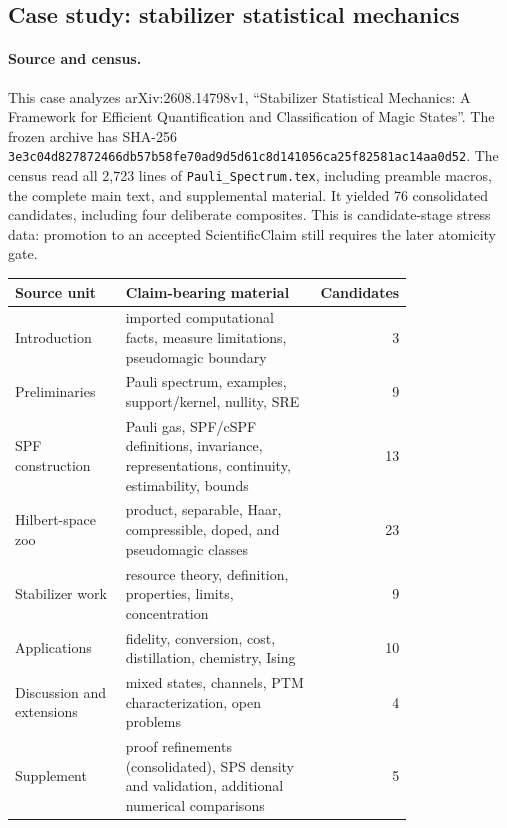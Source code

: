 \subsection{Case study: stabilizer statistical mechanics}\label{case:2608-14798}

\paragraph{Source and census.}
This case analyzes arXiv:2608.14798v1, ``Stabilizer Statistical Mechanics: A Framework for Efficient Quantification and Classification of Magic States''. The frozen archive has SHA-256 \texttt{3e3c04d827872466db57b58fe70ad9d5d61c8d141056ca25f82581ac14aa0d52}. The census read all 2,723 lines of \texttt{Pauli\_Spectrum.tex}, including preamble macros, the complete main text, and supplemental material. It yielded 76 consolidated candidates, including four deliberate composites. This is candidate-stage stress data: promotion to an accepted ScientificClaim still requires the later atomicity gate.

\begin{center}
\begin{tabular}{p{0.29\linewidth}p{0.50\linewidth}r}
\toprule
Source unit & Claim-bearing material & Candidates\\
\midrule
Introduction & imported computational facts, measure limitations, pseudomagic boundary & 3\\
Preliminaries & Pauli spectrum, examples, support/kernel, nullity, SRE & 9\\
SPF construction & Pauli gas, SPF/cSPF definitions, invariance, representations, continuity, estimability, bounds & 13\\
Hilbert-space zoo & product, separable, Haar, compressible, doped, and pseudomagic classes & 23\\
Stabilizer work & resource theory, definition, properties, limits, concentration & 9\\
Applications & fidelity, conversion, cost, distillation, chemistry, Ising & 10\\
Discussion and extensions & mixed states, channels, PTM characterization, open problems & 4\\
Supplement & proof refinements (consolidated), SPS density and validation, additional numerical comparisons & 5\\
\bottomrule
\end{tabular}
\end{center}

